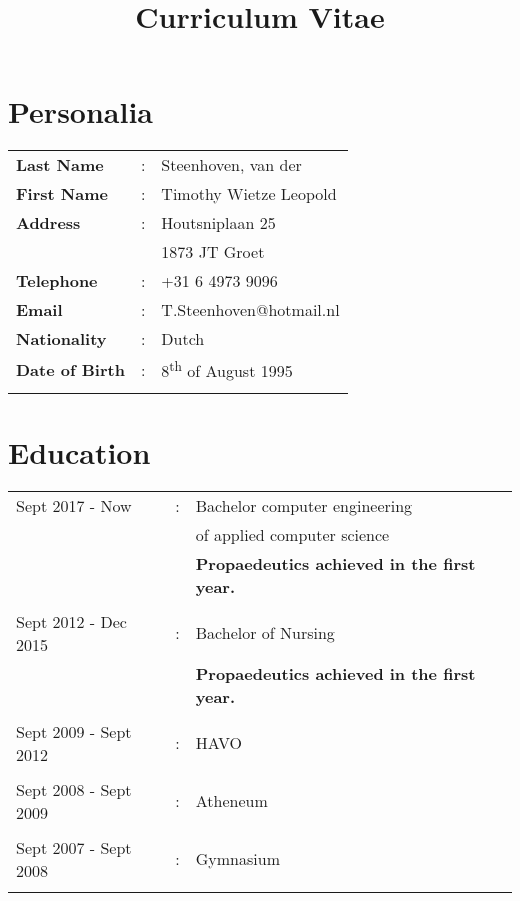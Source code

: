 \documentclass[11pt]{article}
\title{\huge Curriculum Vitae}
\begin{document}
	\thispagestyle{plain}
	\maketitle
	
	\section*{Personalia}
	\begin{table}[H]
		\begin{tabular}{l c l}
			\textbf{Last Name} & : & Steenhoven, van der \\
			\textbf{First Name}& : & Timothy Wietze Leopold\\
			\textbf{Address}& : & Houtsniplaan 25 \\
			&& 1873 JT Groet \\
			\textbf{Telephone}& : & +31 6 4973 9096 \\
			\textbf{Email}& : & T.Steenhoven@hotmail.nl\\
			\textbf{Nationality}& : & Dutch\\
			\textbf{Date of Birth}& : & 8\textsuperscript{th} of August 1995\\
			&&\\
		\end{tabular}
	\end{table}
	
	\section*{Education}
	
	\begin{table}[H]
		\begin{tabular}{l c l}
		 Sept 2017 - Now & : & 	Bachelor computer engineering \\ 
		&&of applied computer science\\
		&&\textbf{Propaedeutics achieved in the first year.}\\
		&&\\
		Sept 2012 - Dec 2015	&:&Bachelor of Nursing \\
		&&\textbf{Propaedeutics achieved in the first year.}\\
		&&\\
		Sept 2009 - Sept 2012 &:& HAVO \\
		&&\\
		Sept 2008 - Sept 2009 &:& Atheneum \\
		&&\\
		Sept 2007 - Sept 2008 &:& Gymnasium \\
		&&\\
		\end{tabular}
	\end{table}
	
\end{document}
